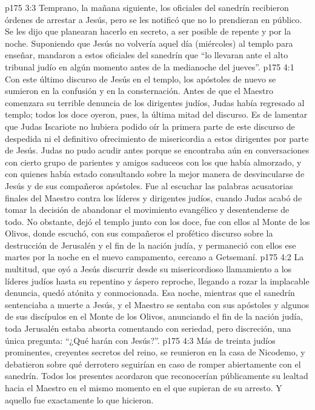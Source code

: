 \vs p175 3:3 Temprano, la mañana siguiente, los oficiales del sanedrín recibieron órdenes de arrestar a Jesús, pero se les notificó que no lo prendieran en público. Se les dijo que planearan hacerlo en secreto, a ser posible de repente y por la noche. Suponiendo que Jesús no volvería aquel día (miércoles) al templo para enseñar, mandaron a estos oficiales del sanedrín que “lo llevaran ante el alto tribunal judío en algún momento antes de la medianoche del jueves”.
\vs p175 4:1 Con este último discurso de Jesús en el templo, los apóstoles de nuevo se sumieron en la confusión y en la consternación. Antes de que el Maestro comenzara su terrible denuncia de los dirigentes judíos, Judas había regresado al templo; todos los doce oyeron, pues, la última mitad del discurso. Es de lamentar que Judas Iscariote no hubiera podido oír la primera parte de este discurso de despedida ni el definitivo ofrecimiento de misericordia a estos dirigentes por parte de Jesús. Judas no pudo acudir antes porque se encontraba aún en conversaciones con cierto grupo de parientes y amigos saduceos con los que había almorzado, y con quienes había estado consultando sobre la mejor manera de desvincularse de Jesús y de sus compañeros apóstoles. Fue al escuchar las palabras acusatorias finales del Maestro contra los líderes y dirigentes judíos, cuando Judas acabó de tomar la decisión de abandonar el movimiento evangélico y desentenderse de todo. No obstante, dejó el templo junto con los doce, fue con ellos al Monte de los Olivos, donde escuchó, con sus compañeros el profético discurso sobre la destrucción de Jerusalén y el fin de la nación judía, y permaneció con ellos ese martes por la noche en el nuevo campamento, cercano a Getsemaní.
\vs p175 4:2 \pc La multitud, que oyó a Jesús discurrir desde su misericordioso llamamiento a los líderes judíos hasta su repentino y áspero reproche, llegando a rozar la implacable denuncia, quedó atónita y conmocionada. Esa noche, mientras que el sanedrín sentenciaba a muerte a Jesús, y el Maestro se sentaba con sus apóstoles y algunos de sus discípulos en el Monte de los Olivos, anunciando el fin de la nación judía, toda Jerusalén estaba absorta comentando con seriedad, pero discreción, una única pregunta: “¿Qué harán con Jesús?”.
\vs p175 4:3 \pc Más de treinta judíos prominentes, creyentes secretos del reino, se reunieron en la casa de Nicodemo, y debatieron sobre qué derrotero seguirían en caso de romper abiertamente con el sanedrín. Todos los presentes acordaron que reconocerían públicamente su lealtad hacia el Maestro en el mismo momento en el que supieran de su arresto. Y aquello fue exactamente lo que hicieron.
